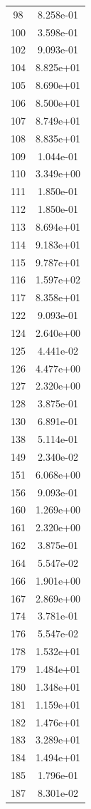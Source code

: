 \documentclass[12pt]{article}
\begin{document}
\begin{longtable}{@{}cc@{}}
98 & 8.258e-01 \\
100 & 3.598e-01 \\
102 & 9.093e-01 \\
104 & 8.825e+01 \\
105 & 8.690e+01 \\
106 & 8.500e+01 \\
107 & 8.749e+01 \\
108 & 8.835e+01 \\
109 & 1.044e-01 \\
110 & 3.349e+00 \\
111 & 1.850e-01 \\
112 & 1.850e-01 \\
113 & 8.694e+01 \\
114 & 9.183e+01 \\
115 & 9.787e+01 \\
116 & 1.597e+02 \\
117 & 8.358e+01 \\
122 & 9.093e-01 \\
124 & 2.640e+00 \\
125 & 4.441e-02 \\
126 & 4.477e+00 \\
127 & 2.320e+00 \\
128 & 3.875e-01 \\
130 & 6.891e-01 \\
138 & 5.114e-01 \\
149 & 2.340e-02 \\
151 & 6.068e+00 \\
156 & 9.093e-01 \\
160 & 1.269e+00 \\
161 & 2.320e+00 \\
162 & 3.875e-01 \\
164 & 5.547e-02 \\
166 & 1.901e+00 \\
167 & 2.869e+00 \\
174 & 3.781e-01 \\
176 & 5.547e-02 \\
178 & 1.532e+01 \\
179 & 1.484e+01 \\
180 & 1.348e+01 \\
181 & 1.159e+01 \\
182 & 1.476e+01 \\
183 & 3.289e+01 \\
184 & 1.494e+01 \\
185 & 1.796e-01 \\
187 & 8.301e-02 \\

\end{longtable}
\end{document}

